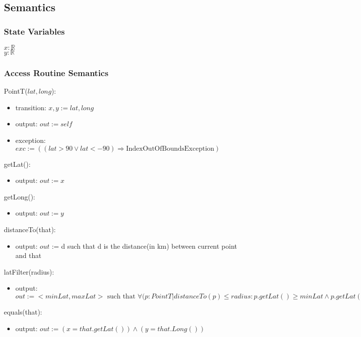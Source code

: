 \documentclass[12pt]{article}
\begin{document}
\subsection* {Semantics}

\subsubsection* {State Variables}

$\mathit{x}: \mathbb{R}$\\
$\mathit{y}: \mathbb{R}$\\


\subsubsection* {Access Routine Semantics}

PointT($lat, long$):
\begin{itemize}
\item transition: $x,y := lat, long$ 
\item output: $\mathit{out} := \mathit{self}$
\item exception: $exc := ((lat > 90 \lor lat < -90) \Rightarrow \mbox{IndexOutOfBoundsException})$
\end{itemize}


\noindent getLat():
\begin{itemize}
\item output: $\mathit{out} := x$ 
\end{itemize}

\noindent getLong():
\begin{itemize}
\item output: $\mathit{out} := y$
\end{itemize}

\noindent distanceTo(that):
\begin{itemize}
\item output: $\mathit{out}$ := d such that d is the distance(in km) between current point and that
\end{itemize}

\noindent latFilter(radius):
\begin{itemize}
\item output: $\mathit{out} := <minLat, maxLat> \mbox{ such that } \forall (p: PointT| 
  distanceTo(p) \le radius : p.getLat() \ge minLat \land p.getLat() \le maxLat$
\end{itemize}

\noindent equals(that):
\begin{itemize}
\item output: $\mathit{out} := (x = that.getLat()) \land (y = that.Long())$
\end{itemize}
\end{document}
